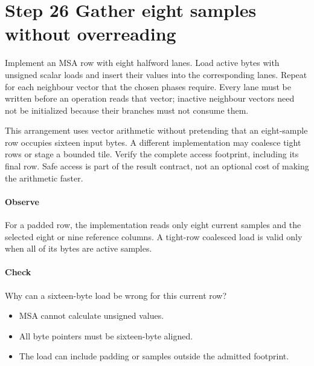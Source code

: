 \section{Step 26 Gather eight samples without overreading}\label{h263-prediction-s06}
Implement an MSA row with eight halfword lanes. Load active bytes with unsigned
scalar loads and insert their values into the corresponding lanes. Repeat for
each neighbour vector that the chosen phases require. Every lane must be written
before an operation reads that vector; inactive neighbour vectors need not be
initialized because their branches must not consume them.

This arrangement uses vector arithmetic without pretending that an eight-sample
row occupies sixteen input bytes. A different implementation may coalesce tight
rows or stage a bounded tile. Verify the complete access footprint, including
its final row. Safe access is part of the result contract, not an optional cost
of making the arithmetic faster.

\paragraph{Observe} For a padded row, the implementation reads only eight
current samples and the selected eight or nine reference columns. A tight-row
coalesced load is valid only when all of its bytes are active samples.
\paragraph{Check} Why can a sixteen-byte load be wrong for this current row?
\begin{itemize}
  \item[A.] MSA cannot calculate unsigned values.
  \item[B.] All byte pointers must be sixteen-byte aligned.
  \item[C.] The load can include padding or samples outside the admitted footprint.
\end{itemize}
